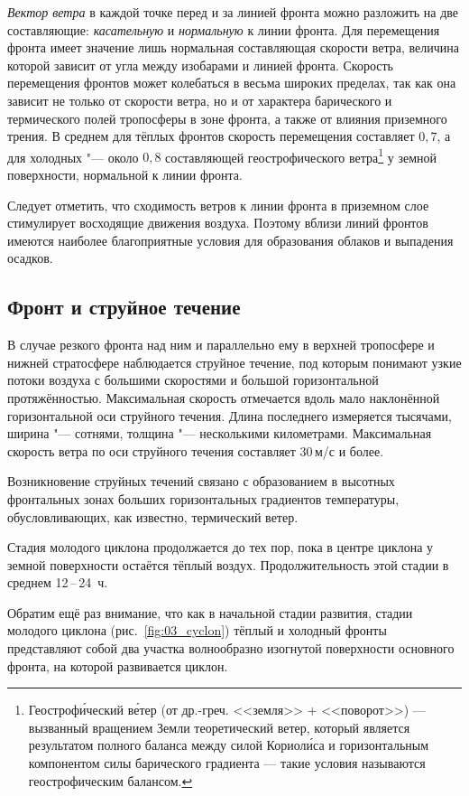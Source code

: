 \documentclass[a4paper, 12pt, twoside, final, book, russian, fittopage, cyremdash, openright]{ncc}
\newcommand{\mps}{\,м/с\xspace}
\newcommand{\otdo}{\,--\,}
\begin{document}
\textit{Вектор ветра} в каждой точке перед и за линией фронта можно
разложить на две составляющие: \textit{касательную} и
\textit{нормальную} к линии фронта. Для перемещения фронта имеет
значение лишь нормальная составляющая скорости ветра, величина которой
зависит от угла между изобарами и линией фронта. Скорость перемещения
фронтов может колебаться в весьма широких пределах, так как она
зависит не только от скорости ветра, но и от характера барического и
термического полей тропосферы в зоне фронта, а также от влияния
приземного трения. В среднем для тёплых фронтов скорость перемещения
составляет $0,7$, а для холодных "--- около $0,8$ составляющей
геострофического ветра\footnote{Геостроф\'{и}ческий в\'{е}тер (от
  др.-греч. <<земля>> + <<поворот>>) — вызванный вращением Земли
  теоретический ветер, который является результатом полного баланса
  между силой Кориол\'{и}са и горизонтальным компонентом силы
  барического градиента — такие условия называются геострофическим
  балансом.}  у земной поверхности, нормальной к линии фронта.

Следует отметить, что сходимость ветров к линии фронта в приземном
слое стимулирует восходящие движения воздуха. Поэтому вблизи линий
фронтов имеются наиболее благоприятные условия для образования облаков
и выпадения осадков.

\subsection{Фронт и струйное течение}
\label{sec:front_and_stream}

В случае резкого фронта над ним и параллельно ему в верхней тропосфере
и нижней стратосфере наблюдается струйное течение, под которым
понимают узкие потоки воздуха с большими скоростями и большой
горизонтальной протяжённостью. Максимальная скорость отмечается вдоль
мало наклонённой горизонтальной оси струйного течения. Длина
последнего измеряется тысячами, ширина "--- сотнями, толщина "---
несколькими километрами. Максимальная скорость ветра по оси струйного
течения составляет 30\mps и более.

Возникновение струйных течений связано с образованием в высотных
фронтальных зонах больших горизонтальных градиентов температуры,
обусловливающих, как известно, термический ветер.

Стадия молодого циклона продолжается до тех пор, пока в центре циклона
у земной поверхности остаётся тёплый воздух. Продолжительность этой
стадии в среднем 12\otdo24~ч.

Обратим ещё раз внимание, что как в начальной стадии развития, стадии
молодого циклона (рис.~\ref{fig:03_cyclon}) тёплый и холодный фронты представляют собой два
участка волнообразно изогнутой поверхности основного фронта, на
которой развивается циклон.
\end{document}
